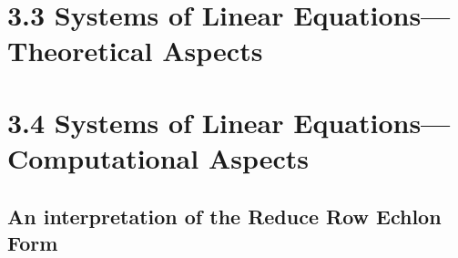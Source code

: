 \section{3.3 Systems of Linear Equations—Theoretical Aspects }









\section{3.4 Systems of Linear Equations—Computational Aspects } 








\subsection{An interpretation of the Reduce Row Echlon Form}







